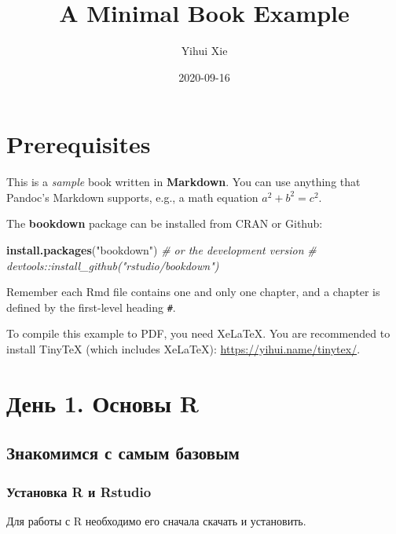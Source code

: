 \documentclass[]{book}
\title{A Minimal Book Example}
\author{Yihui Xie}
\date{2020-09-16}
\newenvironment{Shaded}{\begin{snugshade}}{\end{snugshade}}
\newcommand{\KeywordTok}[1]{\textcolor[rgb]{0.13,0.29,0.53}{\textbf{#1}}}
\newcommand{\StringTok}[1]{\textcolor[rgb]{0.31,0.60,0.02}{#1}}
\newcommand{\CommentTok}[1]{\textcolor[rgb]{0.56,0.35,0.01}{\textit{#1}}}
\newcommand{\NormalTok}[1]{#1}
\begin{document}
\maketitle

{
\setcounter{tocdepth}{1}
\tableofcontents
}
\chapter{Prerequisites}\label{prerequisites}

This is a \emph{sample} book written in \textbf{Markdown}. You can use
anything that Pandoc's Markdown supports, e.g., a math equation
\(a^2 + b^2 = c^2\).

The \textbf{bookdown} package can be installed from CRAN or Github:

\begin{Shaded}
\begin{Highlighting}[]
\KeywordTok{install.packages}\NormalTok{(}\StringTok{"bookdown"}\NormalTok{)}
\CommentTok{# or the development version}
\CommentTok{# devtools::install_github("rstudio/bookdown")}
\end{Highlighting}
\end{Shaded}

Remember each Rmd file contains one and only one chapter, and a chapter
is defined by the first-level heading \texttt{\#}.

To compile this example to PDF, you need XeLaTeX. You are recommended to
install TinyTeX (which includes XeLaTeX):
\url{https://yihui.name/tinytex/}.

\chapter{День 1. Основы R}\label{intro}

\section{Знакомимся с самым базовым}\label{very_base}

\subsection{Установка R и Rstudio}\label{install}

Для работы с R необходимо его сначала скачать и установить.
\end{document}
